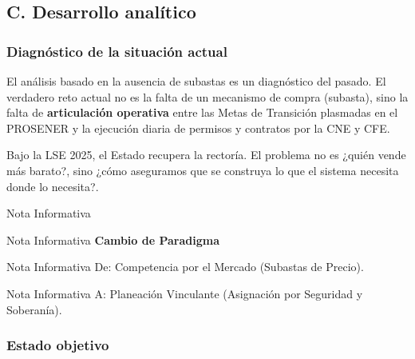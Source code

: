 \documentclass{cel}
\begin{document}
\subsection{C. Desarrollo analítico}
\nopagebreak

\subsubsection{Diagnóstico de la situación actual}
\nopagebreak

El análisis basado en la \textquotedbl{}ausencia de subastas\textquotedbl{} es un diagnóstico del pasado. El verdadero reto actual no es la falta de un mecanismo de compra (subasta), sino la falta de \textbf{articulación operativa} entre las Metas de Transición plasmadas en el PROSENER y la ejecución diaria de permisos y contratos por la CNE y CFE.


Bajo la LSE 2025, el Estado recupera la rectoría. El problema no es \textquotedbl{}¿quién vende más barato?\textquotedbl{}, sino \textquotedbl{}¿cómo aseguramos que se construya lo que el sistema necesita donde lo necesita?\textquotedbl{}.


\vspace{0.2cm}
\begin{glowBox}[gobmxDorado]{Nota Informativa}

\end{glowBox}
\vspace{0.2cm}
\begin{glowBox}[gobmxDorado]{Nota Informativa}
\textbf{Cambio de Paradigma}
\end{glowBox}
\vspace{0.2cm}
\begin{glowBox}[gobmxDorado]{Nota Informativa}
De: \textquotedbl{}Competencia por el Mercado\textquotedbl{} (Subastas de Precio).
\end{glowBox}
\vspace{0.2cm}
\begin{glowBox}[gobmxDorado]{Nota Informativa}
A: \textquotedbl{}Planeación Vinculante\textquotedbl{} (Asignación por Seguridad y Soberanía).
\end{glowBox}

\subsubsection{Estado objetivo}
\nopagebreak
\end{document}
